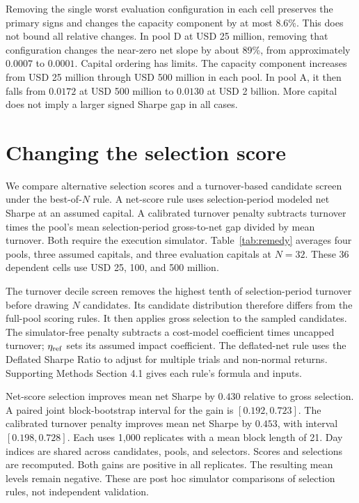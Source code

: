 \documentclass{article}
\begin{document}
Removing the single worst evaluation configuration in each cell preserves the primary signs and changes the capacity component by at most 8.6\%. This does not bound all relative changes. In pool D at USD 25 million, removing that configuration changes the near-zero net slope by about 89\%, from approximately $0.0007$ to $0.0001$. Capital ordering has limits. The capacity component increases from USD 25 million through USD 500 million in each pool. In pool A, it then falls from $0.0172$ at USD 500 million to $0.0130$ at USD 2 billion. More capital does not imply a larger signed Sharpe gap in all cases.

\section{Changing the selection score}
We compare alternative selection scores and a turnover-based candidate screen under the best-of-$N$ rule. A net-score rule uses selection-period modeled net Sharpe at an assumed capital. A calibrated turnover penalty subtracts turnover times the pool's mean selection-period gross-to-net gap divided by mean turnover. Both require the execution simulator. Table~\ref{tab:remedy} averages four pools, three assumed capitals, and three evaluation capitals at $N=32$. These 36 dependent cells use USD 25, 100, and 500 million.



The turnover decile screen removes the highest tenth of selection-period turnover before drawing $N$ candidates. Its candidate distribution therefore differs from the full-pool scoring rules. It then applies gross selection to the sampled candidates. The simulator-free penalty subtracts a cost-model coefficient times uncapped turnover; $\eta_{\rm ref}$ sets its assumed impact coefficient. The deflated-net rule uses the Deflated Sharpe Ratio to adjust for multiple trials and non-normal returns. Supporting Methods Section 4.1 gives each rule's formula and inputs.

Net-score selection improves mean net Sharpe by $0.430$ relative to gross selection. A paired joint block-bootstrap interval for the gain is $[0.192,0.723]$. The calibrated turnover penalty improves mean net Sharpe by $0.453$, with interval $[0.198,0.728]$. Each uses 1,000 replicates with a mean block length of 21. Day indices are shared across candidates, pools, and selectors. Scores and selections are recomputed. Both gains are positive in all replicates. The resulting mean levels remain negative. These are post hoc simulator comparisons of selection rules, not independent validation.
\end{document}
